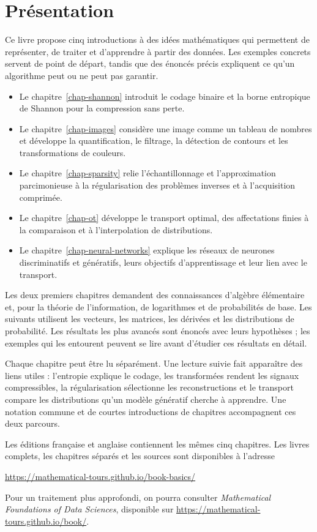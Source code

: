 \chapter*{Présentation}
Ce livre propose cinq introductions à des idées mathématiques qui permettent de représenter, de traiter et d'apprendre à partir des données. Les exemples concrets servent de point de départ, tandis que des énoncés précis expliquent ce qu'un algorithme peut ou ne peut pas garantir.
\begin{itemize}
\item Le chapitre~\ref{chap-shannon} introduit le codage binaire et la borne entropique de Shannon pour la compression sans perte.
\item Le chapitre~\ref{chap-images} considère une image comme un tableau de nombres et développe la quantification, le filtrage, la détection de contours et les transformations de couleurs.
\item Le chapitre~\ref{chap-sparsity} relie l'échantillonnage et l'approximation parcimonieuse à la régularisation des problèmes inverses et à l'acquisition comprimée.
\item Le chapitre~\ref{chap-ot} développe le transport optimal, des affectations finies à la comparaison et à l'interpolation de distributions.
\item Le chapitre~\ref{chap-neural-networks} explique les réseaux de neurones discriminatifs et génératifs, leurs objectifs d'apprentissage et leur lien avec le transport.
\end{itemize}
Les deux premiers chapitres demandent des connaissances d'algèbre élémentaire et, pour la théorie de l'information, de logarithmes et de probabilités de base. Les suivants utilisent les vecteurs, les matrices, les dérivées et les distributions de probabilité. Les résultats les plus avancés sont énoncés avec leurs hypothèses ; les exemples qui les entourent peuvent se lire avant d'étudier ces résultats en détail.

Chaque chapitre peut être lu séparément. Une lecture suivie fait apparaître des liens utiles : l'entropie explique le codage, les transformées rendent les signaux compressibles, la régularisation sélectionne les reconstructions et le transport compare les distributions qu'un modèle génératif cherche à apprendre. Une notation commune et de courtes introductions de chapitres accompagnent ces deux parcours.

Les éditions française et anglaise contiennent les mêmes cinq chapitres. Les livres complets, les chapitres séparés et les sources sont disponibles à l'adresse
\begin{center}\url{https://mathematical-tours.github.io/book-basics/}\end{center}
Pour un traitement plus approfondi, on pourra consulter \emph{Mathematical Foundations of Data Sciences}, disponible sur \url{https://mathematical-tours.github.io/book/}.

